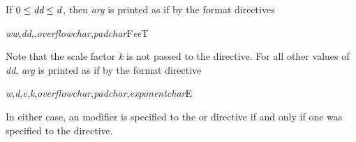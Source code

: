 \begin{flushdesc}
If $0\leq\hbox{\it dd}\leq {\it d}$, then {\it arg} is printed
as if by the format directives
\begin{lisp}
{\Xtilde}{\it ww},{\it dd},,{\it overflowchar},{\it padchar}F{\Xtilde}{\it ee}{\Xatsign}T
\end{lisp}
Note that the scale factor {\it k} is not passed to the 
directive.  For all other values of {\it dd}, {\it arg} is printed as if
by the format directive
\begin{lisp}
{\Xtilde}{\it w},{\it d},{\it e},{\it k},{\it overflowchar},{\it padchar},{\it exponentchar}E
\end{lisp}

In either case, an \cd{{\Xatsign}} modifier is specified to the 
or  directive if and only if one was specified to the
 directive.


\end{flushdesc}
